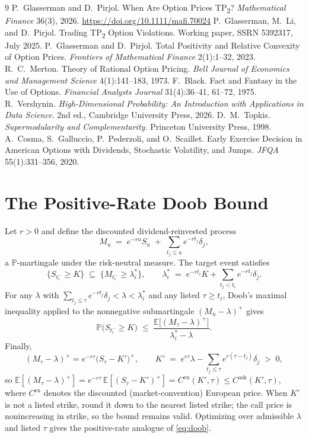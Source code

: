 \documentclass[11pt]{article}
\theoremstyle{remark}
\newcommand{\E}{\mathbb{E}}
\newcommand{\Prob}{\mathbb{P}}
\begin{document}
\begin{thebibliography}{9}
 P.~Glasserman and D.~Pirjol. When Are Option Prices TP\textsubscript{2}? \emph{Mathematical Finance} 36(3), 2026. \url{https://doi.org/10.1111/mafi.70024}
 P.~Glasserman, M.~Li, and D.~Pirjol. Trading TP\textsubscript{2} Option Violations. Working paper, SSRN 5392317, July 2025.
 P.~Glasserman and D.~Pirjol. Total Positivity and Relative Convexity of Option Prices. \emph{Frontiers of Mathematical Finance} 2(1):1--32, 2023.
 R.~C.~Merton. Theory of Rational Option Pricing. \emph{Bell Journal of Economics and Management Science} 4(1):141--183, 1973.
 F.~Black. Fact and Fantasy in the Use of Options. \emph{Financial Analysts Journal} 31(4):36--41, 61--72, 1975.
 R.~Vershynin. \emph{High-Dimensional Probability: An Introduction with Applications in Data Science}. 2nd ed., Cambridge University Press, 2026.
 D.~M.~Topkis. \emph{Supermodularity and Complementarity.} Princeton University Press, 1998.
 A.~Cosma, S.~Galluccio, P.~Pederzoli, and O.~Scaillet. Early Exercise Decision in American Options with Dividends, Stochastic Volatility, and Jumps. \emph{JFQA} 55(1):331--356, 2020.
\end{thebibliography}


\appendix
\section{The Positive-Rate Doob Bound}\label{app:doobr}
Let $r>0$ and define the discounted dividend-reinvested process
\[
M_u\;=\;e^{-ru}S_u\;+\;\sum_{t_j\le u}e^{-rt_j}\delta_j,
\]
a $\Prob$-martingale under the risk-neutral measure. The target event satisfies
\[
\{S_{t_i^-}\ge K\}\;\subseteq\;\Big\{M_{t_i^-}\ge \lambda_i^*\Big\},
\qquad
\lambda_i^*\;=\;e^{-rt_i}K+\sum_{t_j<t_i}e^{-rt_j}\delta_j .
\]
For any $\lambda$ with $\sum_{t_j\le\tau}e^{-rt_j}\delta_j<\lambda<\lambda_i^*$ and any listed $\tau\ge t_i$, Doob's maximal inequality applied to the nonnegative submartingale $(M_u-\lambda)^+$ gives
\[
\Prob\big(S_{t_i^-}\ge K\big)\;\le\;\frac{\E\big[(M_\tau-\lambda)^+\big]}{\lambda_i^*-\lambda}.
\]
Finally,
\[
(M_\tau-\lambda)^+=e^{-r\tau}\Big(S_\tau-K'\Big)^+,
\qquad
K'\;=\;e^{r\tau}\lambda-\sum_{t_j\le\tau}e^{r(\tau-t_j)}\delta_j\;>\;0,
\]
so $\E[(M_\tau-\lambda)^+]=e^{-r\tau}\,\E[(S_\tau-K')^+]=C^{\mathrm{eu}}(K',\tau)\le C^{\mathrm{ask}}(K',\tau)$, where $C^{\mathrm{eu}}$ denotes the discounted (market-convention) European price. When $K'$ is not a listed strike, round it down to the nearest listed strike; the call price is nonincreasing in strike, so the bound remains valid. Optimizing over admissible $\lambda$ and listed $\tau$ gives the positive-rate analogue of \eqref{eq:doob}.
\end{document}
